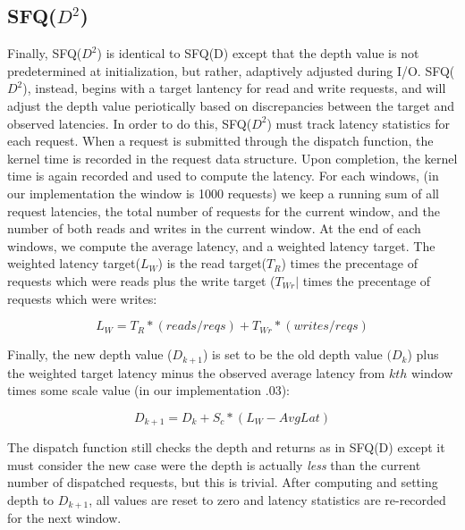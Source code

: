 \subsection{SFQ($D^2$)}

Finally, SFQ($D^2$) is identical to SFQ(D) except that the depth value
is not predetermined at initialization, but rather, adaptively
adjusted during I/O. SFQ($D^2$), instead, begins with a target
lantency for read and write requests, and will adjust the depth value
periotically based on discrepancies between the target and observed
latencies. In order to do this, SFQ($D^2$) must track latency
statistics for each request. When a request is submitted through the
dispatch function, the kernel time is recorded in the request data
structure. Upon completion, the kernel time is again recorded and used
to compute the latency. For each windows, (in our implementation the
window is 1000 requests) we keep a running sum of all request
latencies, the total number of requests for the current window, and
the number of both reads and writes in the current window. At the end
of each windows, we compute the average latency, and a weighted
latency target. The weighted latency target($L_W$) is the read target($T_R$) times
the precentage of requests which were reads plus the write target ($T_{Wr}|$
times the precentage of requests which were writes:

\begin{equation}
  L_W=T_R*(reads/reqs) + T_{Wr}*(writes/reqs)
\end{equation}

Finally, the new depth value ($D_{k+1}$) is set to be the old depth
value $(D_k$) plus the weighted target latency minus the observed
average latency from $kth$ window times some scale value (in our
implementation .03):

\begin{equation}
  D_{k+1}=D_k + S_c*(L_W - AvgLat)
\end{equation}

The dispatch function still checks the depth and returns as in SFQ(D)
except it must consider the new case were the depth is actually
\emph{less} than the current number of dispatched requests, but this
is trivial. After computing and setting depth to $D_{k+1}$, all values
are reset to zero and latency statistics are re-recorded for the next
window.

